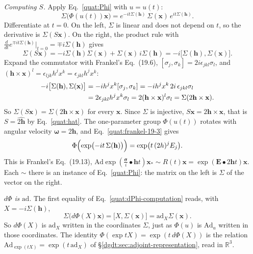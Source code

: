 \emph{Computing $S$.} Apply Eq.~\eqref{quat:Phi} with $u=u(t)$:
\begin{equation}
 \Sigma\bigl(\Phi(u(t))\mathbf x\bigr)
 =e^{-it\Sigma(\mathbf h)}\,\Sigma(\mathbf x)\,e^{it\Sigma(\mathbf h)} .
\end{equation}
Differentiate at $t=0$. On the left, $\Sigma$ is linear and does not depend
on $t$, so the derivative is $\Sigma(S\mathbf x)$. On the right, the product
rule with $\frac{d}{dt}e^{\mp it\Sigma(\mathbf h)}\big|_{t=0}
=\mp i\Sigma(\mathbf h)$ gives
\begin{equation}
 \Sigma(S\mathbf x)=-i\Sigma(\mathbf h)\Sigma(\mathbf x)
   +\Sigma(\mathbf x)\,i\Sigma(\mathbf h)
 =-i\bigl[\Sigma(\mathbf h),\Sigma(\mathbf x)\bigr].
\end{equation}
Expand the commutator with Frankel's Eq.~(19.6),
$[\sigma_j,\sigma_k]=2i\epsilon_{jkl}\sigma_l$, and
$(\mathbf h\times\mathbf x)^l=\epsilon_{ljk}h^jx^k=\epsilon_{jkl}h^jx^k$:
\begin{align}
 -i\bigl[\Sigma(\mathbf h),\Sigma(\mathbf x)\bigr]
 &=-ih^jx^k[\sigma_j,\sigma_k]
  =-ih^jx^k\,2i\,\epsilon_{jkl}\sigma_l\notag\\
 &=2\epsilon_{jkl}h^jx^k\sigma_l
  =2(\mathbf h\times\mathbf x)^l\sigma_l
  =\Sigma(2\mathbf h\times\mathbf x).\label{quat:dPhi-computation}
\end{align}
So $\Sigma(S\mathbf x)=\Sigma(2\mathbf h\times\mathbf x)$ for every
$\mathbf x$. Since $\Sigma$ is injective, $S\mathbf x=2\mathbf h\times\mathbf x$,
that is $S=\widehat{2\mathbf h}$ by Eq.~\eqref{quat:hat}. The
one-parameter group $\Phi(u(t))$ rotates with angular velocity
$\boldsymbol\omega=2\mathbf h$, and Eq.~\eqref{quat:frankel-19-3} gives
\begin{equation}\label{quat:frankel-19-13}
 \Phi\Bigl(\exp\bigl(-it\,\Sigma(\mathbf h)\bigr)\Bigr)
 =\exp\bigl(t\,(2h)^jE_j\bigr).
\end{equation}
This is Frankel's Eq.~(19.13),
$\mathrm{Ad}\exp(\frac{\boldsymbol\sigma}{i}\bullet\mathbf ht)\mathbf x_*
\sim R(t)\mathbf x=\exp(\mathbf E\bullet2\mathbf ht)\mathbf x$. Each $\sim$
there is an instance of Eq.~\eqref{quat:Phi}: the matrix on the left is
$\Sigma$ of the vector on the right.

\emph{$d\Phi$ is $\mathrm{ad}$.} The first equality of
Eq.~\eqref{quat:dPhi-computation} reads, with $X=-i\Sigma(\mathbf h)$,
\begin{equation}
 \Sigma\bigl(d\Phi(X)\mathbf x\bigr)=\bigl[X,\Sigma(\mathbf x)\bigr]
 =\mathrm{ad}_X\Sigma(\mathbf x).
\end{equation}
So $d\Phi(X)$ is $\mathrm{ad}_X$ written in the coordinates $\Sigma$, just as
$\Phi(u)$ is $\mathrm{Ad}_u$ written in those coordinates. The identity
$\Phi(\exp tX)=\exp(t\,d\Phi(X))$ is the relation
$\mathrm{Ad}_{\exp(tX)}=\exp(t\,\mathrm{ad}_X)$ of
\S\ref{dgdt:sec:adjoint-representation}, read in $\mathbb R^3$.

